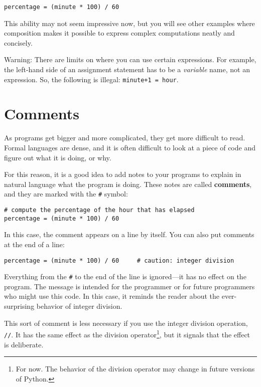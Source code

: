 \beforeverb
\begin{verbatim}
percentage = (minute * 100) / 60
\end{verbatim}
\afterverb
%
This ability may not seem impressive now, but you will see other examples
where composition makes it possible to express complex computations neatly and
concisely.

Warning: There are limits on where you can use certain expressions.  For
example, the left-hand side of an assignment statement has to be a
{\em variable} name, not an expression.  So, the following is illegal:
{\tt minute+1 = hour}.


\section{Comments}

As programs get bigger and more complicated, they get more difficult to
read.  Formal languages are dense, and it is often difficult to look
at a piece of
code and figure out what it is doing, or why.

For this reason, it is a good idea to add notes to your programs to explain
in natural language what the program is doing.  These notes are called
{\bf comments}, and they are marked with the {\tt \#} symbol:

\beforeverb
\begin{verbatim}
# compute the percentage of the hour that has elapsed
percentage = (minute * 100) / 60
\end{verbatim}
\afterverb
%
In this case, the comment appears on a line by itself.  You can also put
comments at the end of a line:

\beforeverb
\begin{verbatim}
percentage = (minute * 100) / 60     # caution: integer division
\end{verbatim}
\afterverb
%
Everything from the {\tt \#} to the end of the line is ignored---it
has no effect on the program.  The message is intended for the programmer or
for future programmers who might use this code.  In this case, it
reminds the reader about the ever-surprising behavior of integer division.


This sort of comment is less necessary if you use the integer division
operation, \verb+//+.  It has the same effect as the division
operator\footnote{For now.  The behavior of the division operator may
change in future versions of Python.}, but it signals that the effect
is deliberate.

